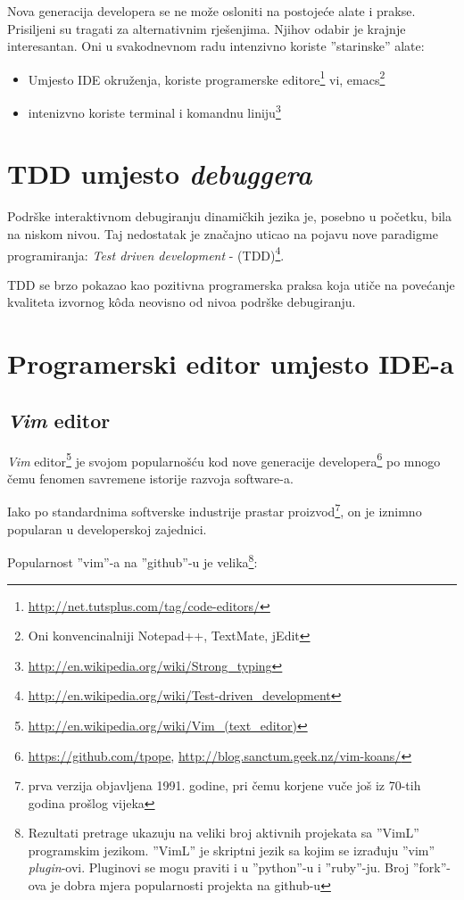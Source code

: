 \documentclass[times, utf8, seminar]{fit}
\begin{document}
Nova generacija developera se ne može osloniti na postojeće alate i prakse. Prisiljeni su tragati za alternativnim rješenjima. Njihov odabir je krajnje interesantan. Oni u svakodnevnom radu intenzivno koriste ''starinske'' alate:
\begin{itemize}
  \item Umjesto IDE okruženja, koriste programerske editore\footnote{\url{http://net.tutsplus.com/tag/code-editors/}} vi, emacs\footnote{Oni konvencinalniji Notepad++, TextMate, jEdit}
  \item intenizvno koriste terminal i komandnu liniju\footnote{\url{http://en.wikipedia.org/wiki/Strong_typing}} 
\end{itemize}

\section{TDD umjesto \emph{debuggera}}

Podrške interaktivnom debugiranju dinamičkih jezika je, posebno u početku, bila na niskom nivou. Taj nedostatak je značajno uticao na pojavu nove paradigme programiranja: \emph{Test driven development} - (TDD)\footnote{\url{http://en.wikipedia.org/wiki/Test-driven_development}}.

TDD se brzo pokazao kao pozitivna programerska praksa koja utiče na povećanje kvaliteta izvornog k\^oda neovisno od nivoa podrške debugiranju. 

\section{Programerski editor umjesto IDE-a}

\subsection{\emph{Vim} editor} 

\emph{Vim} editor\footnote{\url{http://en.wikipedia.org/wiki/Vim_(text_editor)}} je svojom popularnošću kod nove generacije developera\footnote{\url{https://github.com/tpope}, \url{http://blog.sanctum.geek.nz/vim-koans/}} po mnogo čemu fenomen savremene istorije razvoja software-a.

Iako po standardnima softverske industrije prastar proizvod\footnote{prva verzija objavljena 1991. godine, pri čemu korjene vuče još iz 70-tih godina prošlog vijeka}, on je iznimno popularan u developerskoj zajednici.

Popularnost ''vim''-a na ''github''-u je velika\footnote{Rezultati pretrage ukazuju na veliki broj aktivnih projekata sa ''VimL'' programskim jezikom. ''VimL'' je skriptni jezik sa kojim se izrađuju ''vim'' \emph{plugin}-ovi. Pluginovi se mogu praviti i u ''python''-u i ''ruby''-ju. Broj ''fork''-ova je dobra mjera popularnosti projekta na github-u}:
\end{document}
